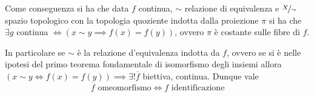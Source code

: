 	\begin{minipage}[t]{0.83\textwidth} \label{proprietà identificazione quoziente e mappa continua indotta}
		Come conseguenza si ha che data $f$ continua, $\sim$ relazione di equivalenza e $\nicefrac{X}{\sim}$ spazio topologico con la topologia quoziente indotta dalla proiezione $\pi$ si ha che $\exists g$ continua $\iff \left( x\sim y \implies f(x)=f(y) \right)$, ovvero $\pi$ è costante sulle fibre di $f$.
	\end{minipage}
 	\begin{minipage}[t]{0.13\textwidth}\vspace{-10pt}
	\end{minipage}
	\begin{minipage}[t]{0.83\textwidth}
		In particolare se $\sim$ è la relazione d'equivalenza indotta da $f$, ovvero se si è nelle ipotesi del primo teorema fondamentale di isomorfismo degli insiemi allora $\left( x\sim y \iff f(x)=f(y) \right) \implies \exists ! \overline{f}$ biettiva, continua. Dunque vale 
			\begin{equation}
				\overline{f} \text{ omeomorfismo} \iff f \text{ identificazione}
			\end{equation}
	 	\end{minipage}
		\begin{minipage}[t]{0.13\textwidth}\vspace{-10pt}
		\end{minipage}\\
	
